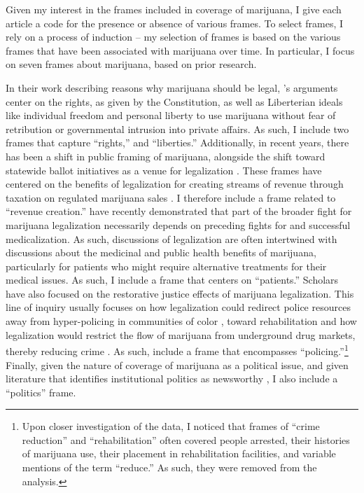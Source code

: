 

Given my interest in the frames included in coverage of marijuana, I give each article a code for the presence or absence of various frames. To select frames, I rely on a process of induction -- my selection of frames is based on the various frames that have been associated with marijuana over time. In particular, I focus on seven frames about marijuana, based on prior research. 

In their work describing reasons why marijuana should be legal, \citet{rosenthal_and_kubby_1996}'s arguments center on the rights, as given by the Constitution, as well as Liberterian ideals like individual freedom and personal liberty to use marijuana without fear of retribution or governmental intrusion into private affairs. As such, I include two frames that capture ``rights,'' and ``liberties.''  Additionally, in recent years, there has been a shift in public framing of marijuana, alongside the shift toward statewide ballot initiatives as a venue for legalization \citep{mosher_and_akins_2019}. These frames have centered on the benefits of legalization for creating streams of revenue through taxation on regulated marijuana sales \citep{caulkins_et_al_2012,miron_2010}. I therefore include a frame related to ``revenue creation.'' \citet{newhart_and_dolphin_2018} have recently demonstrated that part of the broader fight for marijuana legalization necessarily depends on preceding fights for and successful medicalization. As such, discussions of legalization are often intertwined with discussions about the medicinal and public health benefits of marijuana, particularly for patients who might require alternative treatments for their medical issues. As such, I include a frame that centers on ``patients.'' Scholars have also focused on the restorative justice effects of marijuana legalization. This line of inquiry usually focuses on how legalization could redirect police resources away from hyper-policing in communities of color \citep{alexander_2010,davis_2003}, toward rehabilitation \citep{alexander_2010,mosher_and_akins_2019,davis_2003} and how legalization would restrict the flow of marijuana from underground drug markets, thereby reducing crime \citep{mosher_and_akins_2019,caulkins_et_al_2012}. 
As such, include a frame that encompasses ``policing.''\footnote{Upon closer investigation of the data, I noticed that frames of ``crime reduction'' and ``rehabilitation'' often covered people arrested, their histories of marijuana use, their placement in rehabilitation facilities, and variable mentions of the term ``reduce.'' As such, they were removed from the analysis.} %
Finally, given the nature of coverage of marijuana as a political issue, and given literature that identifies institutional politics as newsworthy \citep{amenta_et_al_2012,galtung_and_ruge_1965}, I also include a ``politics'' frame.

